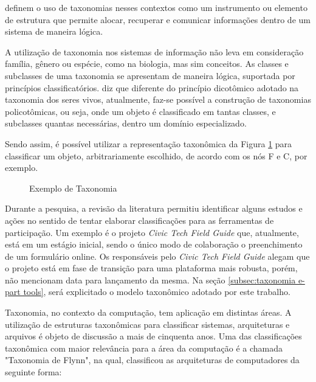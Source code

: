  definem o uso de taxonomias nesses contextos como um instrumento ou elemento de estrutura que permite alocar,
recuperar e comunicar informações dentro de um sistema de maneira lógica.

\par
A utilização de taxonomia nos sistemas de informação não leva em consideração família, gênero ou espécie, como na biologia, mas sim conceitos.
As classes e subclasses de uma taxonomia se apresentam de maneira lógica, suportada por princípios classificatórios.\cite{campos2012taxonomia}
 diz que diferente do princípio dicotômico adotado na taxonomia dos seres vivos, atualmente, faz-se possível a construção de taxonomias
policotômicas, ou seja, onde um objeto é classificado em tantas classes, e subclasses quantas necessárias, dentro um domínio especializado.

\par
Sendo assim, é possível utilizar a representação taxonômica da Figura \ref{fig:exemploTaxonomia} para classificar um objeto, arbitrariamente escolhido,
de acordo com os nós F e C, por exemplo.

\begin{figure}[!ht]
\caption{Exemplo de Taxonomia}
\label{fig:exemploTaxonomia}  
\end{figure}

\par
Durante a pesquisa, a revisão da literatura permitiu identificar alguns estudos e ações no sentido de tentar elaborar classificações para as ferramentas de participação.
Um exemplo é o projeto \textit{Civic Tech Field Guide} que, atualmente, está em um estágio inicial, sendo o único modo de colaboração o preenchimento de um formulário online. 
Os responsáveis pelo \textit{Civic Tech Field Guide} alegam que o projeto está em fase de transição para uma plataforma mais robusta, porém, não mencionam data para lançamento da mesma. 
Na seção \ref{subsec:taxonomia e-part tools}, será explicitado o modelo taxonômico adotado por este trabalho.

\par
Taxonomia, no contexto da computação, tem aplicação em distintas áreas. A utilização de estruturas taxonômicas para classificar sistemas, arquiteturas e arquivos é objeto de discussão a mais de cinquenta anos. 
Uma das classificações taxonômica com maior relevância para a área da computação é a chamada "Taxonomia de Flynn",
na qual,  classificou as arquiteturas de computadores da seguinte forma:\\

